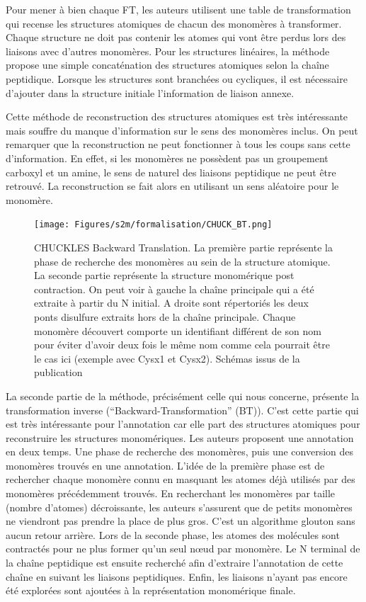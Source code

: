 Pour mener à bien chaque FT, les auteurs utilisent une table de transformation qui recense les structures atomiques de chacun des monomères à transformer.
Chaque structure ne doit pas contenir les atomes qui vont être perdus lors des liaisons avec d'autres monomères.
Pour les structures linéaires, la méthode propose une simple concaténation des structures atomiques selon la chaîne peptidique.
Lorsque les structures sont branchées ou cycliques, il est nécessaire d'ajouter dans la structure initiale l'information de liaison annexe.

Cette méthode de reconstruction des structures atomiques est très intéressante mais souffre du manque d'information sur le sens des monomères inclus.
On peut remarquer que la reconstruction ne peut fonctionner à tous les coups sans cette d'information.
En effet, si les monomères ne possèdent pas un groupement carboxyl et un amine, le sens de naturel des liaisons peptidique ne peut être retrouvé.
La reconstruction se fait alors en utilisant un sens aléatoire pour le monomère.

\begin{figure}[!ht]
  \begin{center}
    \texttt{[image: Figures/s2m/formalisation/CHUCK\_BT.png]}
    \caption{\label{chuck_bt}CHUCKLES Backward Translation.
    La première partie représente la phase de recherche des monomères au sein de la structure atomique.
    La seconde partie représente la structure monomérique post contraction.
    On peut voir à gauche la chaîne principale qui a été extraite à partir du N initial.
    A droite sont répertoriés les deux ponts disulfure extraits hors de la chaîne principale.
    Chaque monomère découvert comporte un identifiant différent de son nom pour éviter d'avoir deux fois le même nom comme cela pourrait être le cas ici (exemple avec Cysx1 et Cysx2).
    Schémas issus de la publication~\cite{siani_chuckles:_1994}}
  \end{center}
\end{figure}

La seconde partie de la méthode, précisément celle qui nous concerne, présente la transformation inverse (``Backward-Transformation'' (BT)).
C'est cette partie qui est très intéressante pour l'annotation car elle part des structures atomiques pour reconstruire les structures monomériques.
Les auteurs proposent une annotation en deux temps.
Une phase de recherche des monomères, puis une conversion des monomères trouvés en une annotation.
L'idée de la première phase est de rechercher chaque monomère connu en masquant les atomes déjà utilisés par des monomères précédemment trouvés.
En recherchant les monomères par taille (nombre d'atomes) décroissante, les auteurs s'assurent que de petits monomères ne viendront pas prendre la place de plus gros.
C'est un algorithme glouton sans aucun retour arrière.
Lors de la seconde phase, les atomes des molécules sont contractés pour ne plus former qu'un seul n\oe{}ud par monomère.
Le N terminal de la chaîne peptidique est ensuite recherché afin d'extraire l'annotation de cette chaîne en suivant les liaisons peptidiques.
Enfin, les liaisons n'ayant pas encore été explorées sont ajoutées à la représentation monomérique finale.

